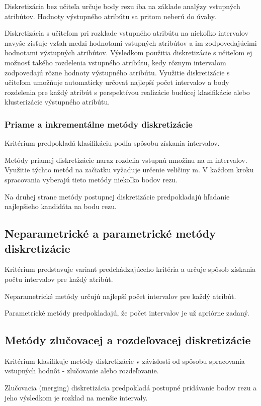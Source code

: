 Diskretizácia bez učiteľa určuje body rezu iba na základe analýzy vstupných atribútov. Hodnoty výstupného atribútu sa pritom neberú do úvahy. 

Diskretizácia s učiteľom pri rozklade vstupného atribútu na niekoľko intervalov navyše zisťuje vzťah medzi hodnotami vstupných atribútov a im zodpovedajúcimi hodnotami výstupných atribútov. Výsledkom použitia diskretizácie s učiteľom ej možnosť takého rozdelenia vstupného atribútu, kedy rôznym intervalom zodpovedajú rôzne hodnoty výstupného atribútu. Využitie diskretizácie s učiteľom umožňuje automaticky určovať najlepší počet intervalov a body rozdelenia pre každý atribút s perspektívou realizácie budúcej klasifikácie alebo klusterizácie výstupného atribútu. %
\cite{levashenkoProj}

\subsubsection{Priame a inkrementálne metódy diskretizácie}
Kritérium predpokladá klasifikáciu podľa spôsobu získania intervalov. 

Metódy priamej diskretizácie naraz rozdelia vstupnú množinu na m intervalov. Využitie týchto metód na začiatku vyžaduje určenie veličiny m. V každom kroku spracovania vyberajú tieto metódy niekoľko bodov rezu. 

Na druhej strane metódy postupnej diskretizácie predpokladajú hľadanie najlepšieho kandidáta na bodu rezu. 
\cite{levashenkoProj}
\subsection{Neparametrické a parametrické metódy diskretizácie }
Kritérium predstavuje variant predchádzajúceho kritéria a určuje spôsob získania počtu intervalov pre každý atribút. 

Neparametrické metódy určujú najlepší počet intervalov pre každý atribút. 

Parametrické metódy predpokladajú, že počet intervalov je už apriórne zadaný. 
\cite{levashenkoProj}

\subsection{Metódy zlučovacej a rozdeľovacej diskretizácie}
Kritérium klasifikuje metódy diskretizácie v závislosti od spôsobu spracovania vstupných hodnôt - zlučovanie alebo rozdeľovanie. 

Zlučovacia (merging) diskretizácia predpokladá postupné pridávanie bodov rezu a jeho výsledkom je rozklad na menšie intervaly. 

